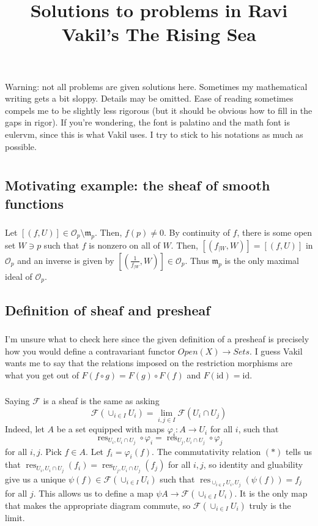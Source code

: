 \documentclass{article}
\title{Solutions to problems in Ravi Vakil's The Rising Sea}
\author{}
\date{}
\newcommand{\id}{\mathrm{id}}
\newcommand{\Set}{\mathit{Sets}}
\DeclareMathOperator{\res}{res}
\newcommand{\Osheaf}{\mathscr{O}}
\newcommand{\Fsheaf}{\mathscr{F}}
\newcommand{\m}{\mathfrak{m}}
\newcommand{\exercise}{\subsubsection} %
\begin{document}
\maketitle

Warning: not all problems are given solutions here. Sometimes my mathematical writing gets a bit sloppy. Details may be omitted. Ease of reading sometimes compels me to be slightly less rigorous (but it should be obvious how to fill in the gaps in rigor). If you're wondering, the font is palatino and the math font is eulervm, since this is what Vakil uses. I try to stick to his notations as much as possible.

\setcounter{section}{1}
\section{}

\subsection{Motivating example: the sheaf of smooth functions}

\exercise{} Let $[(f,U)] \in \Osheaf_p \setminus \m_p$. Then, $f(p) \ne 0$. By continuity of $f$, there is some open set $W \ni p$ such that $f$ is nonzero on all of $W$. Then, $[(f_{\mid W}, W)] = [(f,U)]$ in $\Osheaf_p$ and an inverse is given by $[(\frac{1}{f_{\mid W}}, W)] \in \Osheaf_p$. Thus $\m_p$ is the only maximal ideal of $\Osheaf_p$.

\subsection{Definition of sheaf and presheaf}

\exercise{} I'm unsure what to check here since the given definition of a presheaf is precisely how you would define a contravariant functor $\mathit{Open}(X) \to \Set$. I guess Vakil wants me to say that the relations imposed on the restriction morphisms are what you get out of $F(f\circ g) = F(g) \circ F(f)$ and $F(\id) = \id$.

\exercise{} Saying $\Fsheaf$ is a sheaf is the same as asking
\[\Fsheaf(\cup_{i\in I} U_i) = \lim_{i,j \in I} \Fsheaf (U_i \cap U_j)\]
Indeed, let $A$ be a set equipped with maps $\varphi_i : A \to U_i$ for all $i$, such that
\[\res_{U_i, U_i \cap U_j} \circ \varphi_i = \res_{U_j, U_i \cap U_j} \circ \varphi_j \tag{$*$}\]
for all $i,j$. Pick $f \in A$. Let $f_i = \varphi_i (f)$. The commutativity relation $(*)$ tells us that $\res_{U_i, U_i \cap U_j} (f_i) = \res_{U_j, U_i \cap U_j} (f_j)$ for all $i,j$, so identity and gluability give us a unique $\psi(f) \in \Fsheaf(\cup_{i\in I} U_i)$ such that $\res_{\cup_{i\in I} U_i, U_j} (\psi(f)) = f_j$ for all $j$. This allows us to define a map $\psi A \to \Fsheaf (\cup_{i\in I} U_i)$. It is the only map that makes the appropriate diagram commute, so $\Fsheaf(\cup_{i\in I} U_i)$ truly is the limit.
\end{document}
